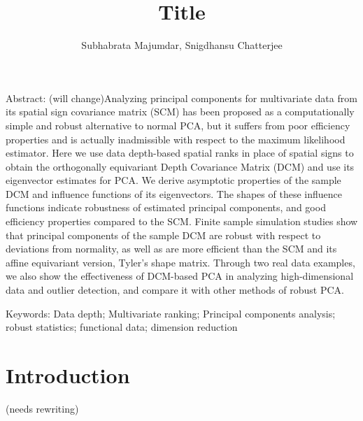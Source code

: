 \documentclass[fleqn,11pt]{article}
\begin{document}
\newtheorem{Theorem}{Theorem}[section]
\newtheorem{Lemma}[Theorem]{Lemma}
\newtheorem{Corollary}[Theorem]{Corollary}
\newtheorem{Proposition}[Theorem]{Proposition}
\newtheorem{Conjecture}[Theorem]{Conjecture}
\theoremstyle{definition} \newtheorem{Definition}[Theorem]{Definition}

\title{Title}
\date{}
\author{Subhabrata Majumdar, Snigdhansu Chatterjee}
\maketitle

Abstract:
{(\colrbf will change)}Analyzing principal components for multivariate data from its spatial sign covariance matrix (SCM) has been proposed as a computationally simple and robust alternative to normal PCA, but it suffers from poor efficiency properties and is actually inadmissible with respect to the maximum likelihood estimator. Here we use data depth-based spatial ranks in place of spatial signs to obtain the orthogonally equivariant Depth Covariance Matrix (DCM) and use its eigenvector estimates for PCA. We derive asymptotic properties of the sample DCM and influence functions of its eigenvectors. The shapes of these influence functions indicate robustness of estimated principal components, and good efficiency properties compared to the SCM. Finite sample simulation studies show that principal components of the sample DCM are robust with respect to deviations from normality, as well as are more efficient than the SCM and its affine equivariant version, Tyler's shape matrix. Through two real data examples, we also show the effectiveness of DCM-based PCA in analyzing high-dimensional data and outlier detection, and compare it with other methods of robust PCA.
\vspace{.5cm}

Keywords:
Data depth; Multivariate ranking; Principal components analysis; robust statistics; functional data; dimension reduction

\newpage
\section{Introduction}

{\colrbf (needs rewriting)}
\end{document}
